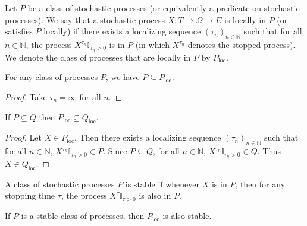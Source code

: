 \begin{definition}\label{def:locally}
  \leanok
Let $P$ be a class of stochastic processes (or equivalently a predicate on stochastic processes).
We say that a stochastic process $X : T \to \Omega \to E$ is locally in $P$ (or satisfies $P$ locally) if there exists a localizing sequence $(\tau_n)_{n \in \mathbb{N}}$ such that for all $n \in \mathbb{N}$, the process $X^{\tau_n}\mathbb{I}_{\tau_n > 0}$ is in $P$ (in which $X^{\tau_n}$ denotes the stopped process).
We denote the class of processes that are locally in $P$ by $P_{\mathrm{loc}}$.
\end{definition}


\begin{lemma}\label{lem:implies_locally}
  \leanok
For any class of processes $P$, we have $P \subseteq P_{\mathrm{loc}}$.
\end{lemma}

\begin{proof}\leanok
Take $\tau_n = \infty$ for all $n$.
\end{proof}


\begin{lemma}\label{lem:locally_mono}
  \leanok
If $P \subseteq Q$ then $P_{\mathrm{loc}} \subseteq Q_{\mathrm{loc}}$.
\end{lemma}

\begin{proof}\leanok
Let $X \in P_{\mathrm{loc}}$.
Then there exists a localizing sequence $(\tau_n)_{n \in \mathbb{N}}$ such that for all $n \in \mathbb{N}$, $X^{\tau_n}\mathbb{I}_{\tau_n > 0} \in P$.
Since $P \subseteq Q$, for all $n \in \mathbb{N}$, $X^{\tau_n}\mathbb{I}_{\tau_n > 0} \in Q$.
Thus $X \in Q_{\mathrm{loc}}$.
\end{proof}


\begin{definition}\label{def:stable}
  \leanok
A class of stochastic processes $P$ is stable if whenever $X$ is in $P$, then for any stopping time $\tau$, the process $X^{\tau}\mathbb{I}_{\tau > 0}$ is also in $P$.
\end{definition}


\begin{lemma}\label{lem:isStable_locally}
  \leanok
If $P$ is a stable class of processes, then $P_{\mathrm{loc}}$ is also stable.
\end{lemma}

